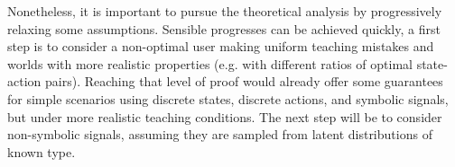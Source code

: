 
Nonetheless, it is important to pursue the theoretical analysis by progressively relaxing some assumptions. Sensible progresses can be achieved quickly, a first step is to consider a non-optimal user making uniform teaching mistakes and worlds with more realistic properties (e.g. with different ratios of optimal state-action pairs). Reaching that level of proof would already offer some guarantees for simple scenarios using discrete states, discrete actions, and symbolic signals, but under more realistic teaching conditions. The next step will be to consider non-symbolic signals, assuming they are sampled from latent distributions of known type.

